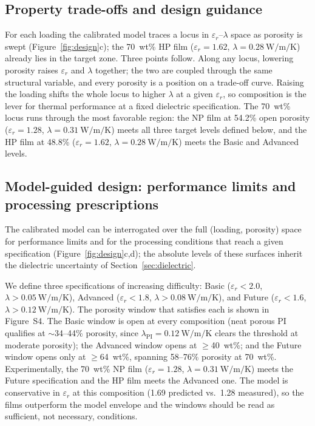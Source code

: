 \documentclass[preprint,a4paper]{elsarticle}
\newcommand{\eps}{\ensuremath{\varepsilon_r}}   %
\newcommand{\lam}{\ensuremath{\lambda}}
\begin{document}
\subsection{Property trade-offs and design guidance}
\label{sec:ashby}
For each loading the calibrated model traces a locus in \eps--\lam{} space as porosity is swept (Figure~\ref{fig:design}c); the 70~wt\% HP film ($\eps = 1.62$, $\lam = \SI{0.28}{\watt\per\meter\per\kelvin}$) already lies in the target zone. Three points follow. Along any locus, lowering porosity raises \eps{} and \lam{} together; the two are coupled through the same structural variable, and every porosity is a position on a trade-off curve. Raising the loading shifts the whole locus to higher \lam{} at a given \eps, so composition is the lever for thermal performance at a fixed dielectric specification. The 70~wt\% locus runs through the most favorable region: the NP film at 54.2\% open porosity ($\eps = 1.28$, $\lam = \SI{0.31}{\watt\per\meter\per\kelvin}$) meets all three target levels defined below, and the HP film at 48.8\% ($\eps = 1.62$, $\lam = \SI{0.28}{\watt\per\meter\per\kelvin}$) meets the Basic and Advanced levels.

\subsection{Model-guided design: performance limits and processing prescriptions}
\label{sec:optimization}
The calibrated model can be interrogated over the full (loading, porosity) space for performance limits and for the processing conditions that reach a given specification (Figure~\ref{fig:design}c,d); the absolute levels of these surfaces inherit the dielectric uncertainty of Section~\ref{sec:dielectric}.

We define three specifications of increasing difficulty: Basic ($\eps < 2.0$, $\lam > \SI{0.05}{\watt\per\meter\per\kelvin}$), Advanced ($\eps < 1.8$, $\lam > \SI{0.08}{\watt\per\meter\per\kelvin}$), and Future ($\eps < 1.6$, $\lam > \SI{0.12}{\watt\per\meter\per\kelvin}$). The porosity window that satisfies each is shown in Figure~S4. The Basic window is open at every composition (neat porous PI qualifies at $\sim$34--44\% porosity, since $\lam_{\mathrm{PI}} = \SI{0.12}{\watt\per\meter\per\kelvin}$ clears the threshold at moderate porosity); the Advanced window opens at $\geq$40~wt\%; and the Future window opens only at $\geq$64~wt\%, spanning 58--76\% porosity at 70~wt\%. Experimentally, the 70~wt\% NP film ($\eps = 1.28$, $\lam = \SI{0.31}{\watt\per\meter\per\kelvin}$) meets the Future specification and the HP film meets the Advanced one. The model is conservative in \eps{} at this composition (1.69 predicted vs.\ 1.28 measured), so the films outperform the model envelope and the windows should be read as sufficient, not necessary, conditions.
\end{document}
